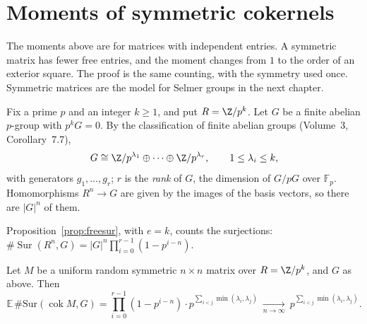 \section{Moments of symmetric cokernels}\label{sec:symmoments}

The moments above are for matrices with independent entries. A symmetric matrix has fewer free entries, and the moment changes from $1$ to the order of an exterior square. The proof is the same counting, with the symmetry used once. Symmetric matrices are the model for Selmer groups in the next chapter.

Fix a prime $p$ and an integer $k\ge1$, and put $R=\Z/p^k$. Let $G$ be a finite abelian $p$-group with $p^kG=0$. By the classification of finite abelian groups (Volume~3, Corollary~7.7),
\[
G\cong\Z/p^{\lambda_1}\oplus\dots\oplus\Z/p^{\lambda_r},\qquad1\le\lambda_i\le k,
\]
with generators $g_1,\dots,g_r$; $r$ is the \emph{rank} of $G$, the dimension of $G/pG$ over $\mathbb F_p$. Homomorphisms $R^n\to G$ are given by the images of the basis vectors, so there are $|G|^n$ of them.

Proposition~\ref{prop:freesur}, with $e=k$, counts the surjections: $\#\operatorname{Sur}(R^n,G)=|G|^n\prod_{i=0}^{r-1}(1-p^{i-n})$.

\begin{theorem}\label{thm:symmoments}
Let $M$ be a uniform random symmetric $n\times n$ matrix over $R=\Z/p^k$, and $G$ as above. Then
\[
\mathbb E\,\#\mathrm{Sur}(\operatorname{cok}M,G)=\prod_{i=0}^{r-1}(1-p^{i-n})\cdot p^{\sum_{i<j}\min(\lambda_i,\lambda_j)}
\ \xrightarrow[n\to\infty]{}\ p^{\sum_{i<j}\min(\lambda_i,\lambda_j)}.
\]
\end{theorem}


